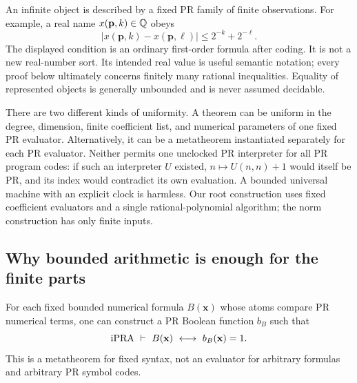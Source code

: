 An infinite object is described by a fixed PR family of finite
observations. For example, a real name $x(\mathbf p,k)\in\mathbb Q$ obeys
\[
 |x(\mathbf p,k)-x(\mathbf p,\ell)|\le2^{-k}+2^{-\ell}.
 \tag{N}\label{eq:regular-name}
\]
The displayed condition is an ordinary first-order formula after coding.
It is not a new real-number sort. Its intended real value is useful
semantic notation; every proof below ultimately concerns finitely many
rational inequalities. Equality of represented objects is generally
unbounded and is never assumed decidable.

There are two different kinds of uniformity. A theorem can be uniform in
the degree, dimension, finite coefficient list, and numerical parameters
of one fixed PR evaluator. Alternatively, it can be a metatheorem
instantiated separately for each PR evaluator. Neither permits one
unclocked PR interpreter for all PR program codes: if such an interpreter
$U$ existed, $n\mapsto U(n,n)+1$ would itself be PR, and its index
would contradict its own evaluation. A bounded universal machine with an
explicit clock is harmless. Our root construction uses fixed coefficient
evaluators and a single rational-polynomial algorithm; the norm
construction has only finite inputs.

\subsection{Why bounded arithmetic is enough for the finite parts}

\begin{lemma}
\label{lem:booleanization}
For each fixed bounded numerical formula $B(\mathbf x)$ whose atoms
compare PR numerical terms, one can construct a PR Boolean function
$b_B$ such that
\[
 \ipra\ \vdash\ B(\mathbf x)\ \longleftrightarrow\ b_B(\mathbf x)=1.
\]
This is a metatheorem for fixed syntax, not an evaluator for arbitrary
formulas and arbitrary PR symbol codes.
\end{lemma}

